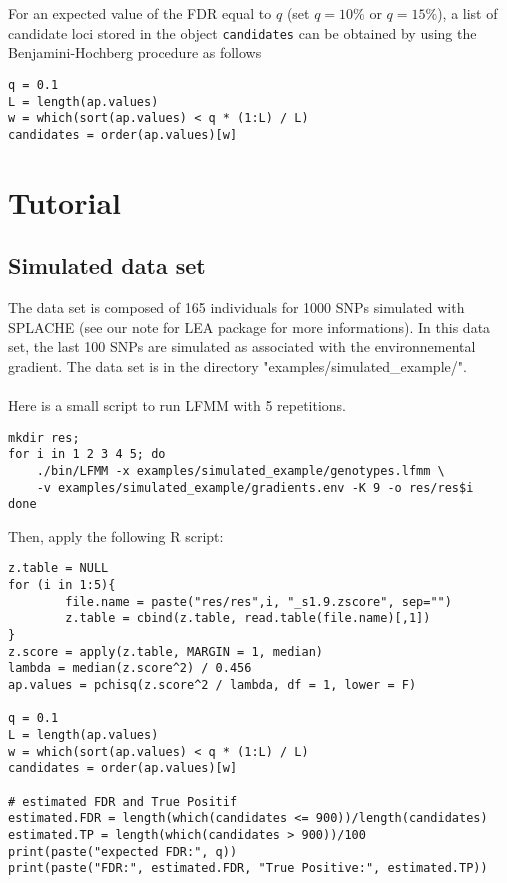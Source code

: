 \documentclass[10pt,a4paper]{article}
\begin{document}
                        
                        
\noindent For an expected value of the FDR equal to $q$  (set $q= 10 \%$ or $q = 15 \%$), a list of candidate loci stored in the object {\tt candidates} can be obtained by using the Benjamini-Hochberg procedure as follows

\begin{Verbatim} 
q = 0.1
L = length(ap.values) 
w = which(sort(ap.values) < q * (1:L) / L)
candidates = order(ap.values)[w]
\end{Verbatim} 

\section{Tutorial}

\subsection{Simulated data set}
The data set is composed of 165 individuals for 1000 SNPs simulated with SPLACHE
(see our note for LEA package for more informations). 
In this data set, the last 100 SNPs are simulated as associated with the 
environnemental gradient. 
The data set is in the directory "examples/simulated\_example/".\\
\\
\noindent
Here is a small script to run LFMM with 5 repetitions. 
\begin{Verbatim}[frame=single]
mkdir res;
for i in 1 2 3 4 5; do
	./bin/LFMM -x examples/simulated_example/genotypes.lfmm \ 
	-v examples/simulated_example/gradients.env -K 9 -o res/res$i 
done
\end{Verbatim}

\noindent
Then, apply the following R script:
\begin{Verbatim}[frame=single]
z.table = NULL
for (i in 1:5){ 
        file.name = paste("res/res",i, "_s1.9.zscore", sep="")
        z.table = cbind(z.table, read.table(file.name)[,1])
}
z.score = apply(z.table, MARGIN = 1, median)
lambda = median(z.score^2) / 0.456
ap.values = pchisq(z.score^2 / lambda, df = 1, lower = F)

q = 0.1
L = length(ap.values) 
w = which(sort(ap.values) < q * (1:L) / L)
candidates = order(ap.values)[w]

# estimated FDR and True Positif
estimated.FDR = length(which(candidates <= 900))/length(candidates)
estimated.TP = length(which(candidates > 900))/100
print(paste("expected FDR:", q))
print(paste("FDR:", estimated.FDR, "True Positive:", estimated.TP))
\end{Verbatim} 
\end{document}
